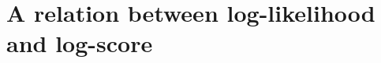 \documentclass[\ifafour a4paper,12pt,\else a5paper,10pt,\fi%
onecolumn,oneside,article,%
british%
]{memoir}
\theoremstyle{remark}
\theoremstyle{innote}
\let\parentext=\parentexttrack%
\newcommand*{\citep}{\footcites}
\newcommand*{\citey}{\footcites}%
\newcommand*{\amp}{\&}
\newcommand*{\p}{\mathrm{P}}%
\newcommand*{\E}{\mathrm{E}}
\renewcommand*{\|}[1][]{\nonscript\,#1\vert\nonscript\;\mathopen{}}
\newcommand*{\chap}{ch.}%
\newcommand*{\etal}{{et al.}}
\newcommand*{\yK}{I}
\begin{document}







\section{A relation between log-likelihood and log-score}
\label{sec:relation}

\end{document}
